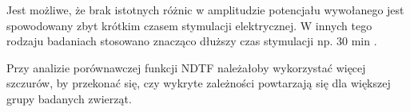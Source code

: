 \documentclass{pracamgr_2}
\begin{document}
	Jest możliwe, że brak istotnych różnic w amplitudzie potencjału wywołanego jest spowodowany zbyt krótkim czasem stymulacji elektrycznej. W innych tego rodzaju badaniach stosowano znacząco dłuższy czas stymulacji np. 30 min \citep{lazzaro}.
	
	Przy analizie porównawczej funkcji NDTF należałoby wykorzystać więcej szczurów, by przekonać się, czy wykryte zależności powtarzają się dla większej grupy badanych zwierząt.

	
	
\end{document}

